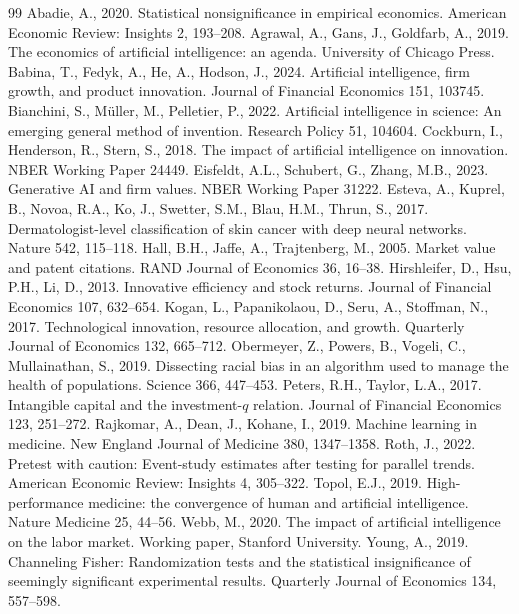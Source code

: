 \documentclass[12pt]{article}
\begin{document}
\begin{thebibliography}{99}
 Abadie, A., 2020. Statistical nonsignificance in empirical
economics. American Economic Review: Insights 2, 193--208.
 Agrawal, A., Gans, J., Goldfarb, A., 2019. The economics
of artificial intelligence: an agenda. University of Chicago Press.
 Babina, T., Fedyk, A., He, A., Hodson, J., 2024.
Artificial intelligence, firm growth, and product innovation. Journal of Financial Economics 151,
103745.
 Bianchini, S., M\"uller, M., Pelletier, P., 2022.
Artificial intelligence in science: An emerging general method of invention. Research Policy 51,
104604.
 Cockburn, I., Henderson, R., Stern, S., 2018. The
impact of artificial intelligence on innovation. NBER Working Paper 24449.
 Eisfeldt, A.L., Schubert, G., Zhang, M.B., 2023.
Generative AI and firm values. NBER Working Paper 31222.
 Esteva, A., Kuprel, B., Novoa, R.A., Ko, J., Swetter, S.M.,
Blau, H.M., Thrun, S., 2017. Dermatologist-level classification of skin cancer with deep neural
networks. Nature 542, 115--118.
 Hall, B.H., Jaffe, A., Trajtenberg, M., 2005. Market value and
patent citations. RAND Journal of Economics 36, 16--38.
 Hirshleifer, D., Hsu, P.H., Li, D., 2013.
Innovative efficiency and stock returns. Journal of Financial Economics 107, 632--654.
 Kogan, L., Papanikolaou, D., Seru, A., Stoffman, N., 2017.
Technological innovation, resource allocation, and growth. Quarterly Journal of Economics 132,
665--712.
 Obermeyer, Z., Powers, B., Vogeli, C., Mullainathan,
S., 2019. Dissecting racial bias in an algorithm used to manage the health of populations. Science
366, 447--453.
 Peters, R.H., Taylor, L.A., 2017. Intangible capital
and the investment-$q$ relation. Journal of Financial Economics 123, 251--272.
 Rajkomar, A., Dean, J., Kohane, I., 2019. Machine
learning in medicine. New England Journal of Medicine 380, 1347--1358.
 Roth, J., 2022. Pretest with caution: Event-study estimates after
testing for parallel trends. American Economic Review: Insights 4, 305--322.
 Topol, E.J., 2019. High-performance medicine: the convergence of
human and artificial intelligence. Nature Medicine 25, 44--56.
 Webb, M., 2020. The impact of artificial intelligence on the labor
market. Working paper, Stanford University.
 Young, A., 2019. Channeling Fisher: Randomization tests and the
statistical insignificance of seemingly significant experimental results. Quarterly Journal of
Economics 134, 557--598.
\end{thebibliography}
\end{document}
